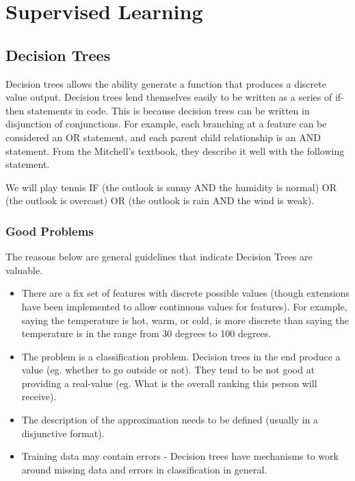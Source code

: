 \documentclass[11pt]{article}
\begin{document}
\section{Supervised Learning}

\subsection{Decision Trees}

Decision trees allows the ability generate a function that produces a discrete value output. Decision trees lend themselves easily to be written as a series of if-then statements in code. This is because decision trees can be written in disjunction of conjunctions. For example, each branching at a feature can be considered an OR statement, and each parent child relationship is an AND statement. From the Mitchell's textbook, they describe it well with the following statement.

We will play tennis IF (the outlook is sunny AND the humidity is normal) OR (the outlook is overcast) OR (the outlook is rain AND the wind is weak).

\subsubsection{Good Problems}

The reasons below are general guidelines that indicate Decision Trees are valuable. 

\begin{itemize}
\item There are a fix set of features with discrete possible values (though extensions have been implemented to allow continuous values for features). For example, saying the temperature is hot, warm, or cold, is more discrete than saying the temperature is in the range from 30 degrees to 100 degrees.
\item The problem is a classification problem. Decision trees in the end produce a value (eg. whether to go outside or not). They tend to be not good at providing a real-value (eg. What is the overall ranking this person will receive).
\item The description of the approximation needs to be defined (usually in a disjunctive format).
\item Training data may contain errors - Decision trees have mechanisms to work around missing data and errors in classification in general.
\end{itemize}
\end{document}
